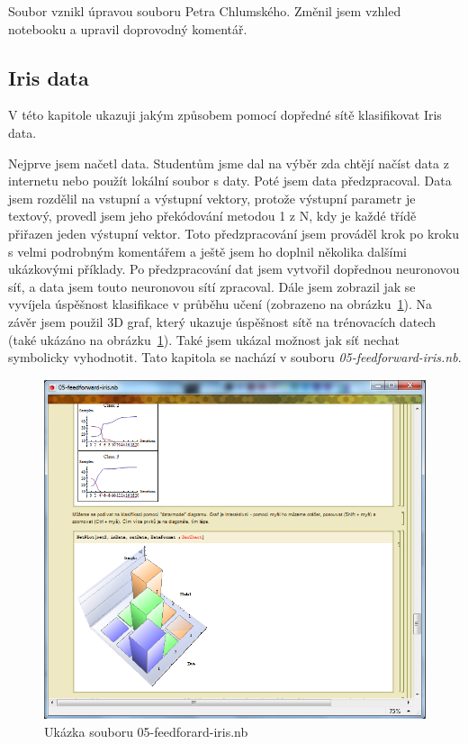 \documentclass[11pt,twoside,a4paper]{book}
\begin{document}
Soubor vznikl úpravou souboru Petra Chlumského.\cite{chlumsky} Změnil jsem vzhled notebooku a upravil doprovodný komentář.

\subsection{Iris data}
V této kapitole ukazuji jakým způsobem pomocí dopředné sítě klasifikovat Iris data.

Nejprve jsem načetl data. Studentům jsme dal na výběr zda chtějí načíst data z internetu nebo použít lokální soubor s daty. Poté jsem data předzpracoval. Data jsem rozdělil na vstupní a výstupní vektory, protože výstupní parametr je textový, provedl jsem jeho překódování metodou 1 z N, kdy je každé třídě přiřazen jeden výstupní vektor. Toto předzpracování jsem prováděl krok po kroku s velmi podrobným komentářem a ještě jsem ho doplnil několika dalšími ukázkovými příklady. Po předzpracování dat jsem vytvořil dopřednou neuronovou síť, a data jsem touto neuronovou sítí zpracoval. Dále jsem zobrazil jak se vyvíjela úspěšnost klasifikace v průběhu učení (zobrazeno na obrázku~\ref{fig:feedforward-iris}). Na závěr jsem použil 3D graf, který ukazuje úspěšnost sítě na trénovacích datech (také ukázáno na obrázku~\ref{fig:feedforward-iris}). Také jsem ukázal možnost jak síť nechat symbolicky vyhodnotit. Tato kapitola se nachází v souboru \textit{05-feedforward-iris.nb}.

\begin{figure}[h!]
\begin{center}
\includegraphics[height=10cm]{figures/ukazka05.png}
\caption{Ukázka souboru 05-feedforard-iris.nb}
\label{fig:feedforward-iris}
\end{center}
\end{figure}
\end{document}
